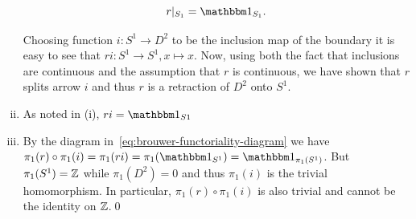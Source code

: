 \begin{problem}
\begin{Solution}
\begin{enumerate}[(i)]
        \[r|_{S_1} = \id_{S_1}.\]

        Choosing function \(i : S^1 \to D^2\) to be the inclusion map of the
        boundary it is easy to see that \(ri : S^1 \to S^1, x \mapsto x\). Now,
        using both the fact that inclusions are continuous and the assumption
        that \(r\) is continuous, we have shown that \(r\) splits arrow \(i\)
        and thus \(r\) is a retraction of \(D^2\) onto \(S^1\).

      \item As noted in (i), \(ri = \id_{S1}\)
      \item By the diagram in~\ref{eq:brouwer-functoriality-diagram} we have
        \(\pi_1(r)\circ \pi_1(i) = \pi_1(ri) = \pi_1(\id_{S^1}) = \id_{\pi_1(S^1)}\).
        But \(\pi_1(S^1) = \mathbb Z\) while \(\pi_1(D^2) = 0\) and thus \(\pi_1(i)\)
        is the trivial homomorphism. In particular, \(\pi_1(r)\circ \pi_1(i)\)
        is also trivial and cannot be the identity on \(\mathbb Z\).\qed{}
    \end{enumerate}
  \end{Solution}

\end{problem}



